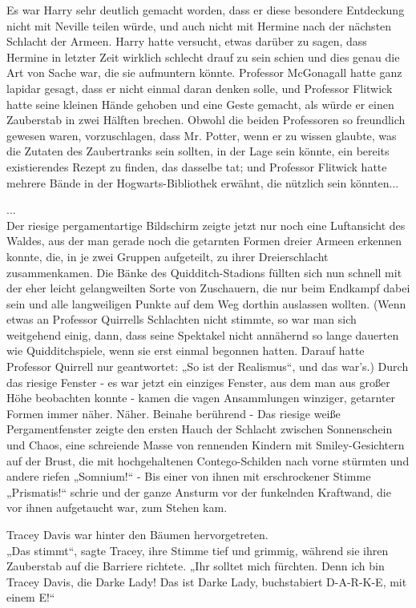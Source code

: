 {Es war Harry sehr deutlich gemacht worden, dass er diese besondere Entdeckung nicht mit Neville teilen würde, und auch nicht mit Hermine nach der nächsten Schlacht der Armeen. Harry hatte versucht, etwas darüber zu sagen, dass Hermine in letzter Zeit wirklich schlecht drauf zu sein schien und dies genau die Art von Sache war, die sie aufmuntern könnte. Professor McGonagall hatte ganz lapidar gesagt, dass er nicht einmal daran denken solle, und Professor Flitwick hatte seine kleinen Hände gehoben und eine Geste gemacht, als würde er einen Zauberstab in zwei Hälften brechen. Obwohl die beiden Professoren so freundlich gewesen waren, vorzuschlagen, dass Mr. Potter, wenn er zu wissen glaubte, was die Zutaten des Zaubertranks sein sollten, in der Lage sein könnte, ein bereits existierendes Rezept zu finden, das dasselbe tat; und Professor Flitwick hatte mehrere Bände in der Hogwarts-Bibliothek erwähnt, die nützlich sein könnten...

...\\ Der riesige pergamentartige Bildschirm zeigte jetzt nur noch eine Luftansicht des Waldes, aus der man gerade noch die getarnten Formen dreier Armeen erkennen konnte, die, in je zwei Gruppen aufgeteilt, zu ihrer Dreierschlacht zusammenkamen. Die Bänke des Quidditch-Stadions füllten sich nun schnell mit der eher leicht gelangweilten Sorte von Zuschauern, die nur beim Endkampf dabei sein und alle langweiligen Punkte auf dem Weg dorthin auslassen wollten. (Wenn etwas an Professor Quirrells Schlachten nicht stimmte, so war man sich weitgehend einig, dann, dass seine Spektakel nicht annähernd so lange dauerten wie Quidditchspiele, wenn sie erst einmal begonnen hatten. Darauf hatte Professor Quirrell nur geantwortet: „So ist der Realismus“, und das war's.) Durch das riesige Fenster - es war jetzt ein einziges Fenster, aus dem man aus großer Höhe beobachten konnte - kamen die vagen Ansammlungen winziger, getarnter Formen immer näher. Näher. Beinahe berührend - Das riesige weiße Pergamentfenster zeigte den ersten Hauch der Schlacht zwischen Sonnenschein und Chaos, eine schreiende Masse von rennenden Kindern mit Smiley-Gesichtern auf der Brust, die mit hochgehaltenen Contego-Schilden nach vorne stürmten und andere riefen „Somnium!“ - Bis einer von ihnen mit erschrockener Stimme „Prismatis!“ schrie und der ganze Ansturm vor der funkelnden Kraftwand, die vor ihnen aufgetaucht war, zum Stehen kam.

Tracey Davis war hinter den Bäumen hervorgetreten.\\ „Das stimmt“, sagte Tracey, ihre Stimme tief und grimmig, während sie ihren Zauberstab auf die Barriere richtete. „Ihr solltet mich fürchten. Denn ich bin Tracey Davis, die Darke Lady! Das ist Darke Lady, buchstabiert D-A-R-K-E, mit einem E!“

}
